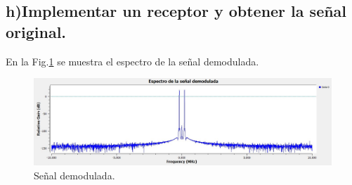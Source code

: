 \subsection*{h)Implementar un receptor y obtener la señal original.}

En la Fig.\ref{fig:ejercicio_6h} se muestra el espectro de la señal demodulada.

    \begin{figure}[H]
        \centering
        \includegraphics[width=0.9\linewidth]{imagenes/Parte_1/Actividad_6/ejercicio_6h.jpg}
        \caption{Señal demodulada.}
        \label{fig:ejercicio_6h}
    \end{figure}